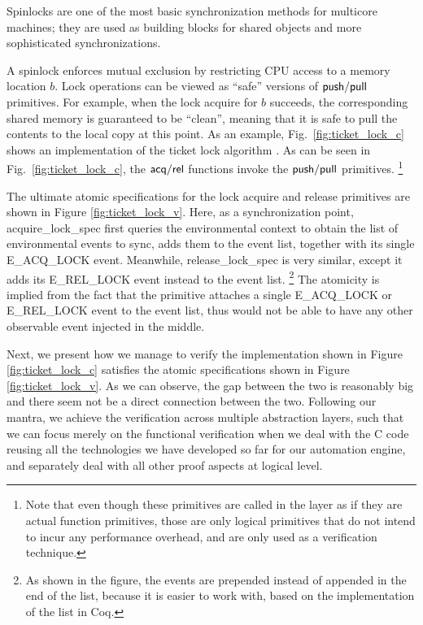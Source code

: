 Spinlocks are one of the most basic synchronization
methods for multicore machines; they are used as building
blocks for shared objects and more sophisticated synchronizations.


A spinlock enforces mutual exclusion by restricting CPU access to
a memory location $b$. Lock operations can be viewed
as ``safe'' versions of $\mathsf{push}/\mathsf{pull}$ primitives.
For example, when the lock acquire  for $b$ succeeds,
the corresponding shared memory is guaranteed
to be ``clean'', meaning that it is safe to 
pull the contents to the local copy at this point.
As an example, Fig.~\ref{fig:ticket_lock_c} shows
an implementation of the ticket lock algorithm \cite{mcs91}.
As can be seen in Fig.~\ref{fig:ticket_lock_c},
the $\mathsf{acq}/\mathsf{rel}$ functions invoke the $\mathsf{push}/\mathsf{pull}$ primitives.
\footnote{Note that even though these primitives are
called in the layer as if they are actual function primitives,
those are only logical primitives that do not intend to incur
any performance overhead, and are only used as a verification
technique.}

The ultimate atomic specifications for the lock acquire and release primitives
are shown in Figure \ref{fig:ticket_lock_v}. 
Here, as a synchronization point, \textsf{acquire\_lock\_spec} first queries the
environmental context to obtain the list of environmental events to sync, adds
them to the event list, together with its single \textsf{E\_ACQ\_LOCK} event.
Meanwhile, \textsf{release\_lock\_spec} is very similar, except it adds its
 \textsf{E\_REL\_LOCK} event instead to the event list. \footnote{As shown in the figure,
 the events are prepended instead of appended in the end of the list, because it is easier
 to work with, based on the implementation of the list in Coq.}
The atomicity is implied from the fact
that the primitive attaches a single \textsf{E\_ACQ\_LOCK} or \textsf{E\_REL\_LOCK}
event to the event list, thus would not be able to have any other observable event
injected in the middle. 

Next, we present how we manage to verify the implementation shown in Figure
\ref{fig:ticket_lock_c} satisfies the atomic specifications shown in Figure
\ref{fig:ticket_lock_v}. As we can observe, the gap between the two is reasonably
big and there seem not be a direct connection between the two.
Following our mantra, we achieve the verification across multiple abstraction layers,
such that we can focus merely on the functional verification when we deal with the
C code reusing all the technologies we have developed so far for our automation engine,
and separately deal with all other proof aspects at logical level.

